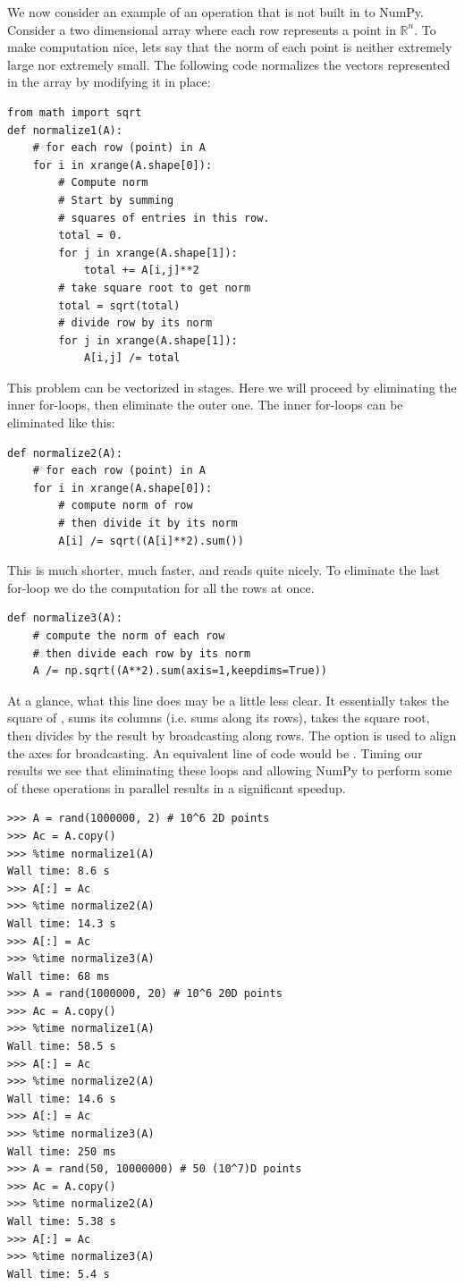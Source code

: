 We now consider an example of an operation that is not built in to NumPy.
Consider a two dimensional array where each row represents a point in $\mathbb{R}^n$.
To make computation nice, lets say that the norm of each point is neither extremely large nor extremely small.
The following code normalizes the vectors represented in the array by modifying it in place:
\begin{lstlisting}
from math import sqrt
def normalize1(A):
    # for each row (point) in A
    for i in xrange(A.shape[0]):
        # Compute norm
        # Start by summing
        # squares of entries in this row.
        total = 0.
        for j in xrange(A.shape[1]):
            total += A[i,j]**2
        # take square root to get norm
        total = sqrt(total)
        # divide row by its norm
        for j in xrange(A.shape[1]):
            A[i,j] /= total
\end{lstlisting}
This problem can be vectorized in stages.
Here we will proceed by eliminating the inner for-loops, then eliminate the outer one.
The inner for-loops can be eliminated like this:
\begin{lstlisting}
def normalize2(A):
    # for each row (point) in A
    for i in xrange(A.shape[0]):
        # compute norm of row
        # then divide it by its norm
        A[i] /= sqrt((A[i]**2).sum())
\end{lstlisting}
This is much shorter, much faster, and reads quite nicely.
To eliminate the last for-loop we do the computation for all the rows at once.
\begin{lstlisting}
def normalize3(A):
    # compute the norm of each row
    # then divide each row by its norm
    A /= np.sqrt((A**2).sum(axis=1,keepdims=True))
\end{lstlisting}
At a glance, what this line does may be a little less clear.
It essentially takes the square of , sums its columns (i.e. sums along its rows), takes the square root, then divides  by the result by broadcasting along rows.
The  option is used to align the axes for broadcasting.
An equivalent line of code would be .
Timing our results we see that eliminating these loops and allowing NumPy to perform some of these operations in parallel results in a significant speedup.
\begin{lstlisting}
>>> A = rand(1000000, 2) # 10^6 2D points
>>> Ac = A.copy()
>>> %time normalize1(A)
Wall time: 8.6 s
>>> A[:] = Ac
>>> %time normalize2(A)
Wall time: 14.3 s
>>> A[:] = Ac
>>> %time normalize3(A)
Wall time: 68 ms
>>> A = rand(1000000, 20) # 10^6 20D points
>>> Ac = A.copy()
>>> %time normalize1(A)
Wall time: 58.5 s
>>> A[:] = Ac
>>> %time normalize2(A)
Wall time: 14.6 s
>>> A[:] = Ac
>>> %time normalize3(A)
Wall time: 250 ms
>>> A = rand(50, 10000000) # 50 (10^7)D points
>>> Ac = A.copy()
>>> %time normalize2(A)
Wall time: 5.38 s
>>> A[:] = Ac
>>> %time normalize3(A)
Wall time: 5.4 s
\end{lstlisting}
